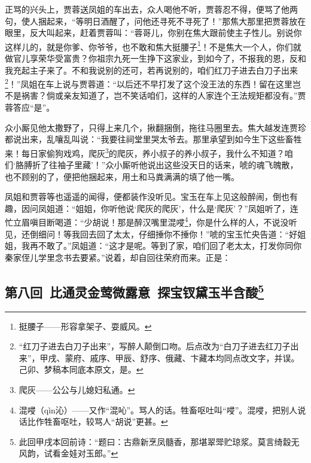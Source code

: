 \par 正骂的兴头上，贾蓉送凤姐的车出去，众人喝他不听，贾蓉忍不得，便骂了他两句，使人捆起来，“等明日酒醒了，问他还寻死不寻死了！”那焦大那里把贾蓉放在眼里，反大叫起来，赶着贾蓉叫：“蓉哥儿，你别在焦大跟前使主子性儿。别说你这样儿的，就是你爹、你爷爷，也不敢和焦大挺腰子\footnote{挺腰子——形容拿架子、耍威风。}！不是焦大一个人，你们就做官儿享荣华受富贵？你祖宗九死一生挣下这家业，到如今了，不报我的恩，反和我充起主子来了。不和我说别的还可，若再说别的，咱们红刀子进去白刀子出来\footnote{“红刀子进去白刀子出来”，写醉人颠倒口吻。后点改为“白刀子进去红刀子出来”，甲戌、蒙府、戚序、甲辰、舒序、俄藏、卞藏本均同点改文字，并误。己卯、梦稿本同底本原文，是。}！”凤姐在车上说与贾蓉道：“以后还不早打发了这个没王法的东西！留在这里岂不是祸害？倘或亲友知道了，岂不笑话咱们，这样的人家连个王法规矩都没有。”贾蓉答应“是”。
\par 众小厮见他太撒野了，只得上来几个，揪翻捆倒，拖往马圈里去。焦大越发连贾珍都说出来，乱嚷乱叫说：“我要往祠堂里哭太爷去。那里承望到如今生下这些畜牲来！每日家偷狗戏鸡，爬灰\footnote{爬灰——公公与儿媳妇私通。}的爬灰，养小叔子的养小叔子，我什么不知道？咱们‘胳膊折了往袖子里藏’！”众小厮听他说出这些没天日的话来，唬的魂飞魄散，也不顾别的了，便把他捆起来，用土和马粪满满的填了他一嘴。
\par 凤姐和贾蓉等也遥遥的闻得，便都装作没听见。宝玉在车上见这般醉闹，倒也有趣，因问凤姐道：“姐姐，你听他说‘爬灰的爬灰’，什么是‘爬灰’？”凤姐听了，连忙立眉嗔目断喝道：“少胡说！那是醉汉嘴里混唚\footnote{混唚（qìn沁）——又作“混吣”。骂人的话。牲畜呕吐叫“唚”。混唚，把别人说话比作牲畜呕吐，较骂人“胡说”更甚。}，你是什么样的人，不说没听见，还倒细问！等我回去回了太太，仔细捶你不捶你！”唬的宝玉忙央告道：“好姐姐，我再不敢了。”凤姐道：“这才是呢。等到了家，咱们回了老太太，打发你同你秦家侄儿学里念书去要紧。”说着，却自回往荣府而来。正是：

\clearpage
\subsection*{第八回\ 比通灵金莺微露意\ 探宝钗黛玉半含酸\footnote{此回甲戌本回前诗：“题曰：古鼎新烹凤髓香，那堪翠斝贮琼浆。莫言绮縠无风韵，试看金娃对玉郎。”}}

